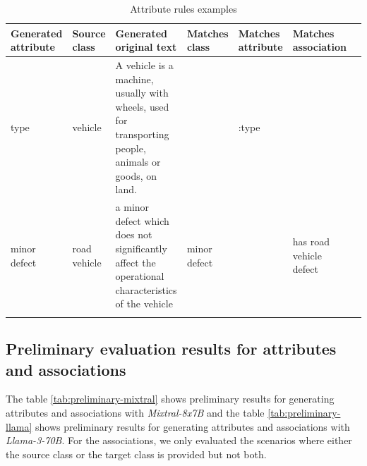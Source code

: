 \begin{table}[!h]
    \scriptsize
    \centering
    \setlength{\tabcolsep}{0.5em}
\begin{tabular}{@{}l>{\raggedright\arraybackslash}p{}>{\raggedright\arraybackslash}p{}>{\raggedright\arraybackslash}p{}>{\raggedright\arraybackslash}p{}>{\raggedright\arraybackslash}p{}>{\raggedright\arraybackslash}p{}@{}}
         Generated attribute & Source class & Generated original text & Matches class & Matches attribute & Matches association \\
    \toprule
    \addlinespace

type & vehicle & A vehicle is a machine, usually with wheels, used for transporting people, animals or goods, on land. & & :type & \\

\addlinespace

minor defect & road vehicle &  a minor defect which does not significantly affect the operational characteristics of the vehicle & minor defect & & has road vehicle defect \\

	\addlinespace
	\bottomrule
	\addlinespace
	\end{tabular}
	\caption{Attribute rules examples}
	\label{tab:attribute-rules}
\end{table}


\subsection{Preliminary evaluation results for attributes and associations}
\label{sec:preliminary_attributes_associations}

The table \ref{tab:preliminary-mixtral} shows preliminary results for generating attributes and associations with \emph{Mixtral-8x7B} and the table \ref{tab:preliminary-llama} shows preliminary results for generating attributes and associations with \emph{Llama-3-70B}. For the associations, we only evaluated the scenarios where either the source class or the target class is provided but not both.

